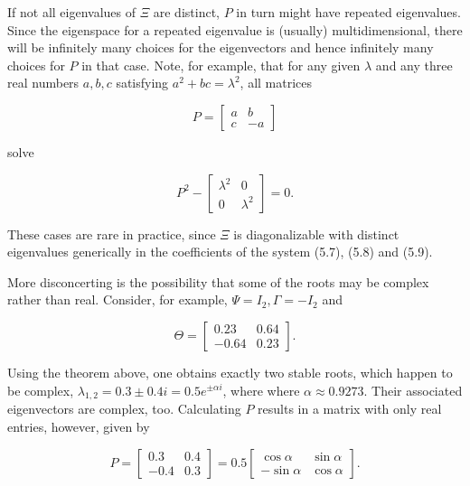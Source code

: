 \documentclass[10pt]{article}
\begin{document}
If not all eigenvalues of $\Xi$ are distinct, $P$ in turn might have repeated eigenvalues. Since the eigenspace for a repeated eigenvalue is (usually) multidimensional, there will be infinitely many choices for the eigenvectors and hence infinitely many choices for $P$ in that case. Note, for example, that for any given $\lambda$ and any three real numbers $a, b, c$ satisfying $a^{2}+b c=\lambda^{2}$, all matrices

\begin{equation*}
P=\left[\begin{array}{ll}
a & b \\
c & -a
\end{array}\right]
\end{equation*}

solve

\begin{equation*}
P^{2}-\left[\begin{array}{ll}
\lambda^{2} & 0 \\
0 & \lambda^{2}
\end{array}\right]=0 .
\end{equation*}

These cases are rare in practice, since $\Xi$ is diagonalizable with distinct eigenvalues generically in the coefficients of the system (5.7), (5.8) and (5.9).

More disconcerting is the possibility that some of the roots may be complex rather than real. Consider, for example, $\Psi=I_{2}, \Gamma=-I_{2}$ and

\begin{equation*}
\Theta=\left[\begin{array}{cc}
0.23 & 0.64 \\
-0.64 & 0.23
\end{array}\right] .
\end{equation*}

Using the theorem above, one obtains exactly two stable roots, which happen to be complex, $\lambda_{1,2}=0.3 \pm 0.4 i=0.5 e^{ \pm \alpha i}$, where where $\alpha \approx 0.9273$. Their associated eigenvectors are complex, too. Calculating $P$ results in a matrix with only real entries, however, given by

\begin{equation*}
P=\left[\begin{array}{cc}
0.3 & 0.4 \\
-0.4 & 0.3
\end{array}\right]=0.5\left[\begin{array}{cc}
\cos \alpha & \sin \alpha \\
-\sin \alpha & \cos \alpha
\end{array}\right] .
\end{equation*}
\end{document}
